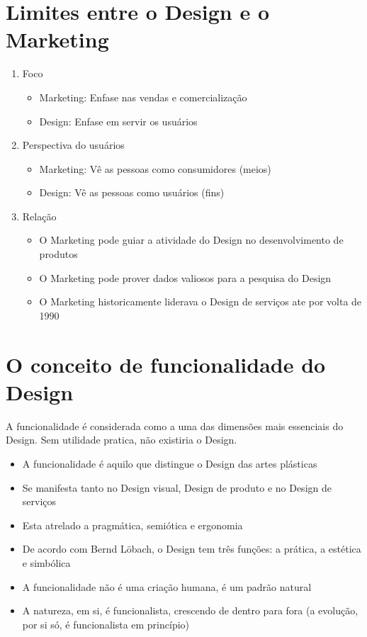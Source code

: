\documentclass{article}
\begin{document}
\section{Limites entre o Design e o Marketing}
\begin{enumerate}
    \item Foco
    \begin{itemize}
        \item Marketing: Enfase nas vendas e comercialização
        \item Design: Enfase em servir os usuários
    \end{itemize}
    \item Perspectiva do usuários
    \begin{itemize}
        \item Marketing: Vê as pessoas como consumidores (meios)
        \item Design: Vê as pessoas como usuários (fins)
    \end{itemize}
    \item Relação
    \begin{itemize}
        \item O Marketing pode guiar a atividade do Design no desenvolvimento de produtos
        \item O Marketing pode prover dados valiosos para a pesquisa do Design
        \item O Marketing historicamente liderava o Design de serviços ate por volta de 1990
    \end{itemize}
\end{enumerate}
\newpage
\section{O conceito de funcionalidade do Design}
A funcionalidade é considerada como a uma das dimensões mais essenciais do Design. Sem utilidade pratica, não existiria o Design.
\begin{itemize}
    \item A funcionalidade é aquilo que distingue o Design das artes plásticas
    \item Se manifesta tanto no Design visual, Design de produto e no Design de serviços
    \item Esta atrelado a pragmática, semiótica e ergonomia
    \item De acordo com Bernd Löbach, o Design tem três funções: a prática, a estética e simbólica
    \item A funcionalidade não é uma criação humana, é um padrão natural
    \item A natureza, em si, é funcionalista, crescendo de dentro para fora (a evolução, por si só, é funcionalista em princípio)
\end{itemize}
\end{document}
